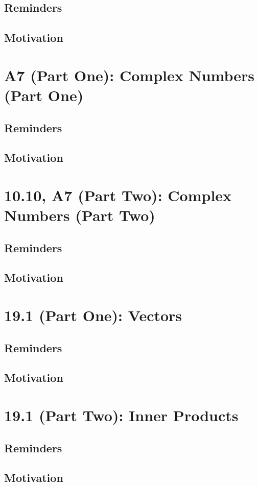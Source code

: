 \documentclass{report}
\begin{document}
\begin{sloppypar}
\section{Reminders}
\section{Motivation}
\chapter{A7 (Part One): Complex Numbers (Part One)}
\section{Reminders}
\section{Motivation}
\chapter{10.10, A7 (Part Two): Complex Numbers (Part Two)}
\section{Reminders}
\section{Motivation}
\chapter{19.1 (Part One): Vectors}
\section{Reminders}
\section{Motivation}
\chapter{19.1 (Part Two): Inner Products}
\section{Reminders}
\section{Motivation}


\end{sloppypar}
\end{document}
